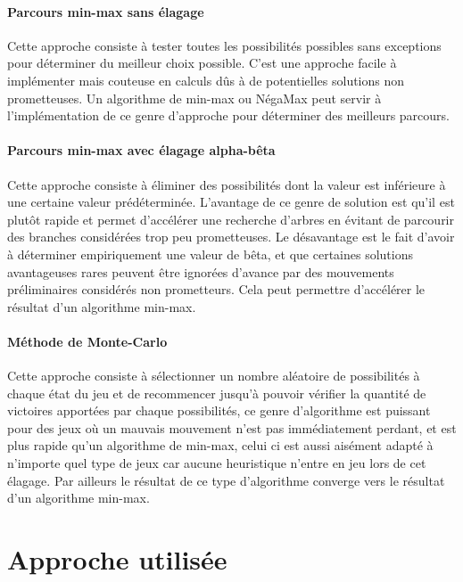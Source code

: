 \documentclass{scrreprt}
\begin{document}
			\paragraph{Parcours min-max sans élagage}
			
			Cette approche consiste à tester toutes les possibilités possibles sans exceptions pour déterminer du meilleur choix possible. C'est une approche facile à implémenter mais couteuse en calculs dûs à de potentielles solutions non prometteuses. Un algorithme de min-max ou NégaMax peut servir à l'implémentation de ce genre d'approche pour déterminer des meilleurs parcours.
			
			\paragraph{Parcours min-max avec élagage alpha-bêta}
			
			Cette approche consiste à éliminer des possibilités dont la valeur est inférieure à une certaine valeur prédéterminée. L'avantage de ce genre de solution est qu'il est plutôt rapide et permet d'accélérer une recherche d'arbres en évitant de parcourir des branches considérées trop peu prometteuses. Le désavantage est le fait d'avoir à déterminer empiriquement une valeur de bêta, et que certaines solutions avantageuses rares peuvent être ignorées d'avance par des mouvements préliminaires considérés non prometteurs. Cela peut permettre d'accélérer le résultat d'un algorithme min-max.
			
			\paragraph{Méthode de Monte-Carlo}
			
			Cette approche consiste à sélectionner un nombre aléatoire de possibilités à chaque état du jeu et de recommencer jusqu'à pouvoir vérifier la quantité de victoires apportées par chaque possibilités, ce genre d'algorithme est puissant pour des jeux où un mauvais mouvement n'est pas immédiatement perdant, et est plus rapide qu'un algorithme de min-max, celui ci est aussi aisément adapté à n'importe quel type de jeux car aucune heuristique n'entre en jeu lors de cet élagage. Par ailleurs le résultat de ce type d'algorithme converge vers le résultat d'un algorithme min-max.
			
			
			
		\section{Approche utilisée}
		
\end{document}
